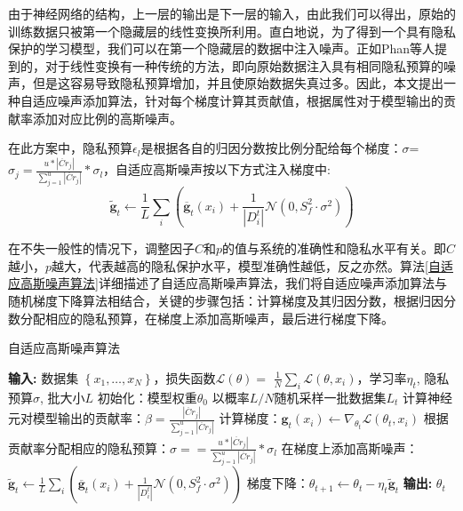 由于神经网络的结构，上一层的输出是下一层的输入，由此我们可以得出，原始的训练数据只被第一个隐藏层的线性变换所利用。直白地说，为了得到一个具有隐私保护的学习模型，我们可以在第一个隐藏层的数据中注入噪声。正如Phan等人提到的，对于线性变换有一种传统的方法，即向原始数据注入具有相同隐私预算的噪声，但是这容易导致隐私预算增加，并且使原始数据失真过多。因此，本文提出一种自适应噪声添加算法，针对每个梯度计算其贡献值，根据属性对于模型输出的贡献率添加对应比例的高斯噪声。

在此方案中，隐私预算$\epsilon_{l}$是根据各自的归因分数按比例分配给每个梯度：$\sigma$=$\sigma_{j}=\frac{u *\left|\ddot{Cr}_{j}\right|}{\sum_{j=1}^{u}\left|\ddot{Cr}_{j}\right|} * \sigma_{l}$，自适应高斯噪声按以下方式注入梯度中:
\begin{equation}\label{eq:神经网络加噪3}
\tilde{\mathbf{g}}_{t} \leftarrow \frac{1}{L} \sum_{i}\left(\overline{\mathbf{g}}_{t}\left(x_{i}\right)+\frac{1}{\left|D_{i}^{t}\right|}\mathcal{N}\left(0, S_{f}^{2} \cdot \sigma^{2}\right)\right)
\end{equation}

在不失一般性的情况下，调整因子$C$和$p$的值与系统的准确性和隐私水平有关。即$C$越小，$p$越大，代表越高的隐私保护水平，模型准确性越低，反之亦然。算法\ref{自适应高斯噪声算法}详细描述了自适应高斯噪声算法，我们将自适应噪声添加算法与随机梯度下降算法相结合，关键的步骤包括：计算梯度及其归因分数，根据归因分数分配相应的隐私预算，在梯度上添加高斯噪声，最后进行梯度下降。\\

\begin{algorithm}[!htb]
	\caption{自适应高斯噪声算法}
	\label{自适应高斯噪声算法}
	\begin{algorithmic}[1]
		\footnotesize
		\STATE \textbf{输入:} 数据集 $\left\{x_{1}, \ldots, x_{N}\right\}$，损失函数$\mathcal{L}(\theta)=$ $\frac{1}{N} \sum_{i} \mathcal{L}\left(\theta, x_{i}\right)$，学习率$\eta_{t}$, 隐私预算$\sigma$, 批大小$L$
		\STATE 初始化：模型权重$\theta_{0}$
			\STATE 以概率$L / N$随机采样一批数据集$L_{t}$
			\STATE 计算神经元对模型输出的贡献率：$\beta=\frac{\left|\ddot{Cr}_{j}\right|}{\sum_{j=1}^{u}\left|\ddot{Cr}_{j}\right|}$
			\STATE 计算梯度：$\mathbf{g}_{t}\left(x_{i}\right) \leftarrow \nabla_{\theta_{t}} \mathcal{L}\left(\theta_{t}, x_{i}\right)$
			\STATE 根据贡献率分配相应的隐私预算：$\sigma==\frac{u *\left|\ddot{Cr}_{j}\right|}{\sum_{j=1}^{u}\left|\ddot{Cr}_{j}\right|} * \sigma_{l}$
			\STATE 在梯度上添加高斯噪声：$\tilde{\mathbf{g}}_{t} \leftarrow \frac{1}{L} \sum_{i}\left(\overline{\mathbf{g}}_{t}\left(x_{i}\right)+\frac{1}{\left|D_{i}^{t}\right|}\mathcal{N}\left(0, S_{f}^{2} \cdot \sigma^{2}\right)\right)$
			\STATE 梯度下降：$\theta_{t+1} \leftarrow \theta_{t}-\eta_{t} \tilde{\mathbf{g}}_{t}$
		\ENDFOR
		\STATE \textbf{输出:} $\theta_{t}$
	\end{algorithmic}
\end{algorithm}

